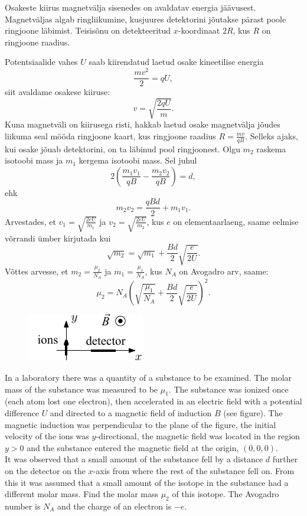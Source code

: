 {\ifHint
Osakeste kiirus magnetvälja sisenedes on avaldatav energia jäävusest. Magnetväljas algab ringliikumine, kusjuures detektorini jõutakse pärast poole ringjoone läbimist. Teisisõnu on detekteeritud $x$-koordinaat $2R$, kus $R$ on ringjoone raadius.
\fi


\ifSolution
Potentsiaalide vahes $U$ saab kiirendatud laetud osake kineetilise
energia
\[
\frac{mv^{2}}{2}=qU,
\]
siit avaldame osakese kiiruse:
\[
v=\sqrt{\frac{2qU}{m}}.
\]
Kuna magnetväli on kiirusega risti, hakkab laetud osake 
magnetvälja jõudes liikuma seal mööda ringjoone kaart, kus ringjoone raadius
$R=\frac{mv}{qB}$. Selleks ajaks, kui osake jõuab detektorini,
on ta läbinud pool ringjoonest. Olgu $m_{2}$ raskema isotoobi
mass ja $m_{1}$ kergema isotoobi mass. Sel juhul 
\[ 
2\left(\frac{m_{1}v_{1}}{qB}-\frac{m_{2}v_{2}}{qB}\right)=d, 
\]
ehk
\[ 
m_{2}v_{2}=\frac{qBd}{2}+m_{1}v_{1 }.
\]
Arvestades, et $v_{1}=\sqrt{\frac{2eU}{m_{1}}}$ ja $v_{2}=\sqrt{\frac{2eU}{m_{2}}}$,
kus $e$ on elementaarlaeng, saame eelmise võrrandi ümber kirjutada kui
\[ \sqrt{m_{2}}=\sqrt{m_{1}}+\frac{Bd}{2}\sqrt{\frac{e}{2U}}. \]
Võttes arvesse, et $m_{2}=\frac{\mu_{2}}{N_{A}}$ ja $m_{1}=\frac{\mu_{1}}{N_{A}}$,
kus $N_{A}$ on Avogadro arv, saame:
\[ \mu_{2}=N_{A}\left(\sqrt{\frac{\mu_{1}}{N_{A}}}+\frac{Bd}{2}\sqrt{\frac{e}{2U}}\right)^{2}.\]
\fi


\ifEngStatement
\begin{figure}%
\includegraphics[width=\linewidth]{2013-v2g-10-massspektromeeter_ipe_ing}%
\end{figure}
In a laboratory there was a quantity of a substance to be examined. The molar mass of the substance was measured to be $\mu_{1}$. The substance was ionized once (each atom lost one electron), then accelerated in an electric field with a potential difference $U$ and directed to a magnetic field of induction $B$ (see figure). The magnetic induction was perpendicular to the plane of the figure, the initial velocity of the ions was $y$-directional, the magnetic field was located in the region $y>0$ and the substance entered the magnetic field at the origin, $(0, 0, 0)$.\\
It was observed that a small amount of the substance fell by a distance $d$ further on the detector on the $x$-axis from where the rest of the substance fell on. From this it was assumed that a small amount of the isotope in the substance had a different molar mass. Find the molar mass $\mu_{2}$ of this isotope. The Avogadro number is $N_A$ and the charge of an electron is $-e$.
\fi


}
